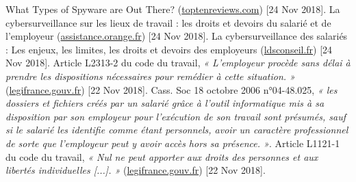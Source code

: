 \documentclass[final, a4paper, 13pt]{article}
\begin{document}
\begin{thebibliography}{9}
     What Types of Spyware are Out There?
    (\hyperlink{https://www.toptenreviews.com/software/articles/types-of-spyware/}{toptenreviews.com})
    [24 Nov 2018].
     La cybersurveillance sur les lieux de travail : les droits et devoirs du salarié et de l’employeur
    (\hyperlink{https://assistance.orange.fr/ordinateurs-peripheriques/installer-et-utiliser/la-securite/risques-et-prevention/conseils-et-reglementation/la-cybersurveillance-sur-les-lieux-de-travail-les-droits-et-devoirs-du-salarie-et-de-l-employeur_77766-78734}{assistance.orange.fr})
    [24 Nov 2018].
     La cybersurveillance des salariés : Les enjeux, les limites, les droits et devoirs des employeurs
    (\hyperlink{https://www.ldsconseil.fr/la-cybersureillance-des-salaries-les-enjeux-les-limites-les-droits-et-devoirs-des-employeurs}{ldsconseil.fr})
    [24 Nov 2018].
     Article L2313-2 du code du travail, \emph{
    « L'employeur procède sans délai à prendre les dispositions nécessaires pour remédier à cette situation. »} (\hyperlink{https://www.legifrance.gouv.fr/affichCodeArticle.do?cidTexte=LEGITEXT000006072050&idArticle=LEGIARTI000006901852&dateTexte=20120207}{legifrance.gouv.fr})
    [22 Nov 2018].
     Cass. Soc 18 octobre 2006 n°04-48.025, \emph{
    « les dossiers et fichiers créés par un salarié grâce à l’outil informatique mis à sa disposition par son employeur pour l’exécution de son travail sont présumés, sauf si le salarié les identifie comme étant personnels, avoir un caractère professionnel de sorte que l’employeur peut y avoir accès hors sa présence. »}.
     Article L1121-1 du code du travail, \emph{« Nul ne peut apporter aux droits des personnes et aux libertés individuelles [...]. »} (\hyperlink{https://www.legifrance.gouv.fr/affichCodeArticle.do?cidTexte=LEGITEXT000006072050&idArticle=LEGIARTI000006900785}{legifrance.gouv.fr})
    [22 Nov 2018].
\end{thebibliography}
\end{document}
